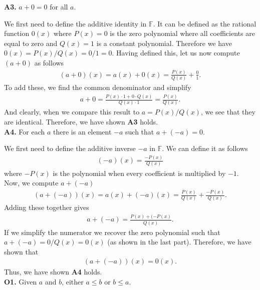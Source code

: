 \documentclass [10pt]{article}
\begin{document}
\begin{enumerate}
\begin{enumerate}
{\textbf{A3.} $a + 0 = 0$ for all $a$. 

We first need to define the additive identity in $\mathbb{F}$. It can be defined as the rational function $0(x)$ where $P(x) = 0$ is the zero polynomial where all coefficients are equal to zero and $Q(x) = 1$ is a constant polynomial. Therefore we have $0(x) = P(x) / Q(x) = 0/1 = 0$. Having defined this, let us now compute $(a +0)$ as follows 
\begin{align*}
    (a+0)(x) = a(x) + 0(x) = \frac{P(x)}{Q(x)} + \frac{0}{1}. 
\end{align*}
To add these, we find the common denominator and simplify 
\begin{align*}
    a + 0 = \frac{P(x) \cdot 1 + 0 \cdot Q(x)}{Q(x) \cdot 1} = \frac{P(x)}{Q(x)}. 
\end{align*}
And clearly, when we compare this result to $a = P(x)/Q(x)$, we see that they are identical. Therefore, we have shown \textbf{A3} holds. \\

\textbf{A4.} For each $a$ there is an element $-a$ such that $a + (-a) = 0$.

We first need to define the additive inverse $-a$ in $\mathbb{F}$. We can define it as follows
\begin{align*}
    (-a)(x) = \frac{- P(x)}{Q(x)}
\end{align*}
where $-P(x)$ is the polynomial when every coefficient is multiplied by $-1$. Now, we compute $a + (-a)$ 
\begin{align*}
    (a+ (-a))(x) = a(x) + (-a)(x) = \frac{P(x)}{Q(x)} + \frac{-P(x)}{Q(x)}.
\end{align*}
Adding these together gives
\begin{align*}
    a + (-a) = \frac{P(x) + (-P(x)}{Q(x)}.
\end{align*}
If we simplify the numerator we recover the zero polynomial such that $a + (-a) = 0/Q(x) = 0(x)$ (as shown in the last part). Therefore, we have shown that  
\begin{align*}
    (a+ (-a))(x) = 0(x).
\end{align*}
Thus, we have shown \textbf{A4} holds. \\

\textbf{O1.} Given $a$ and $b$, either $a \leq b$ or $b \leq a$. 

}
\end{enumerate}
\end{enumerate}
\end{document}

